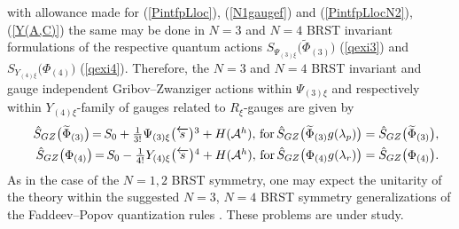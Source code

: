 \documentclass[10pt]{article}
\begin{document}
with allowance made for (\ref{PintfpLloc}),
(\ref{N1gaugef}) and (\ref{PintfpLlocN2}), (\ref{Y(A,C)})
the same may be done in  $N=3$ and $N=4$  BRST invariant formulations of the respective quantum actions
$ S_{\Psi_{(3)\xi}}\big(\widetilde{\Phi}_{(3)}\big)$ (\ref{qexi3}) and $S_{Y_{(4)\xi}}\big({\Phi}_{(4)}\big)$ (\ref{qexi4}).
Therefore, the $N=3$  and $N=4$  BRST invariant and gauge independent Gribov--Zwanziger
actions within $\Psi_{(3)\xi}$ and respectively within $Y_{(4)\xi}$-family of gauges related to $R_\xi$-gauges
are given by
\begin{eqnarray}\label{brstinvgzN3} &&\textstyle  \hat{S}_{GZ}\big(\widetilde{\Phi}_{(3)}\big) \hspace{-0.1em}= \hspace{-0.1em}S_0
+\frac{1}{3!}\Psi_{(3)\xi} \big(\overleftarrow{s}\big){}^3+ H(\mathcal{A}^h) ,\,
\mathrm{for } \,  \hat{S}_{GZ}\big(\widetilde{\Phi}_{(3)}g(\lambda_p)\big)=\hat{S}_{GZ}\big(\widetilde{\Phi}_{(3)}\big),\\
\label{brstinvgzN4} &&\textstyle  \hat{S}_{GZ}\big(\Phi_{(4)}\big) \hspace{-0.1em}= \hspace{-0.1em}S_0
-\frac{1}{4!}Y_{(4)\xi} \big(\overleftarrow{s}\big){}^{4}+ H(\mathcal{A}^h) ,\,
\mathrm{for } \,  \hat{S}_{GZ}\big(\Phi_{(4)}g(\lambda_r)\big)=\hat{S}_{GZ}\big(\Phi_{(4)}\big).
\end{eqnarray}
As in the case of the $N=1,2$ BRST symmetry, one may expect the unitarity of the theory within
the suggested $N=3$, $N=4$ BRST symmetry generalizations of the Faddeev--Popov quantization rules
\cite{fp}. These problems are under study.
\end{document}
